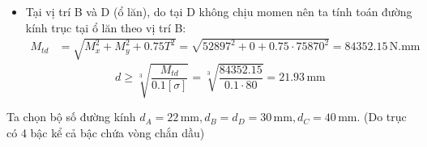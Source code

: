 \begin{itemize}
\begin{itemize}
                            \item Tại vị trí B và D (ổ lăn), do tại D không chịu momen nên ta tính toán đường kính trục tại ổ lăn theo vị trí B:
                                \begin{align*}
                                    M_{td} &= \sqrt{M_{x}^2 + M_{y}^2 +  0.75T^2} = \sqrt{52897^2 + 0 + 0.75 \cdot 75870^2} = 84352.15 \, \mathrm{N.mm}
                                \end{align*}
                                \[
                                    d \geq \sqrt[3]{\frac{M_{td}}{0.1 [\sigma]}} = \sqrt[3]{\frac{84352.15}{0.1 \cdot 80}} = 21.93 \, \mathrm{mm}
                                \]
                        \end{itemize}
                \end{itemize}
                Ta chọn bộ số đường kính $d_A = 22 \, \mathrm{mm}, d_B = d_D = 30 \, \mathrm{mm}, d_C = 40 \, \mathrm{mm}$. (Do trục có 4 bậc kể cả bậc chứa vòng chắn dầu)
